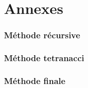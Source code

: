 \documentclass{article}
\newcommand{\code}[1]{}
\begin{document}
\newpage
\part{Annexes}
\section*{Méthode récursive}
\code{Algos/Problem117_1_rapport.py}


\section*{Méthode tetranacci}
\code{Algos/Problem117_2_rapport.py}

\newpage
\section*{Méthode finale}
\code{Algos/Problem117_3_rapport.py}
\end{document}
